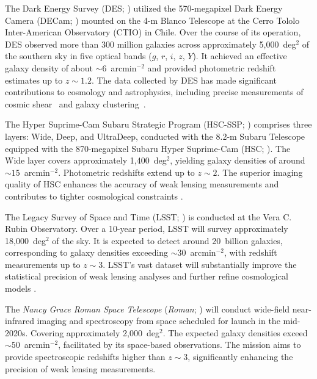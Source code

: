 The Dark Energy Survey (DES; \citealt{2005astro.ph.10346T, 2018ApJS..239...18A, 2021ApJS..255...20A}) utilized the 570-megapixel Dark Energy Camera (DECam; \citealt{2015AJ....150..150F}) mounted on the 4-m Blanco Telescope at the Cerro Tololo Inter-American Observatory (CTIO) in Chile. Over the course of its operation, DES observed more than 300 million galaxies across approximately 5,000~deg$^2$ of the southern sky in five optical bands ($g$, $r$, $i$, $z$, $Y$). It achieved an effective galaxy density of about $\sim 6$~arcmin$^{-2}$ and provided photometric redshift estimates up to $z \sim 1.2$. The data collected by DES has made significant contributions to cosmology and astrophysics, including precise measurements of cosmic shear~\citep{2022PhRvD.105b3514A} and galaxy clustering~\citep{2022PhRvD.105b3520A}. 

The Hyper Suprime-Cam Subaru Strategic Program (HSC-SSP; \citealt{2018PASJ...70S...4A}) comprises three layers: Wide, Deep, and UltraDeep, conducted with the 8.2-m Subaru Telescope equipped with the 870-megapixel Subaru Hyper Suprime-Cam (HSC; \citealt{2018PASJ...70S...1M}). The Wide layer covers approximately 1,400~deg$^2$, yielding galaxy densities of around $\sim 15$~arcmin$^{-2}$. Photometric redshifts extend up to $z \sim 2$. The superior imaging quality of HSC enhances the accuracy of weak lensing measurements and contributes to tighter cosmological constraints \citep{2019PASJ...71...43H}.

The Legacy Survey of Space and Time (LSST; \citealt{2009arXiv0912.0201L, 2019ApJ...873..111I}) is conducted at the Vera C. Rubin Observatory. Over a 10-year period, LSST will survey approximately 18,000~deg$^2$ of the sky. It is expected to detect around 20~billion galaxies, corresponding to galaxy densities exceeding $\sim 30$~arcmin$^{-2}$, with redshift measurements up to $z \sim 3$. LSST's vast dataset will substantially improve the statistical precision of weak lensing analyses and further refine cosmological models \citep{2012arXiv1211.0310L}.

The \textit{Nancy Grace Roman Space Telescope} (\emph{Roman}; \citealt{2015arXiv150303757S}) will conduct wide-field near-infrared imaging and spectroscopy from space scheduled for launch in the mid-2020s. Covering approximately 2,000~deg$^2$. The expected galaxy densities exceed $\sim 50$~arcmin$^{-2}$, facilitated by its space-based observations. The mission aims to provide spectroscopic redshifts higher than $z \sim 3$, significantly enhancing the precision of weak lensing measurements.

